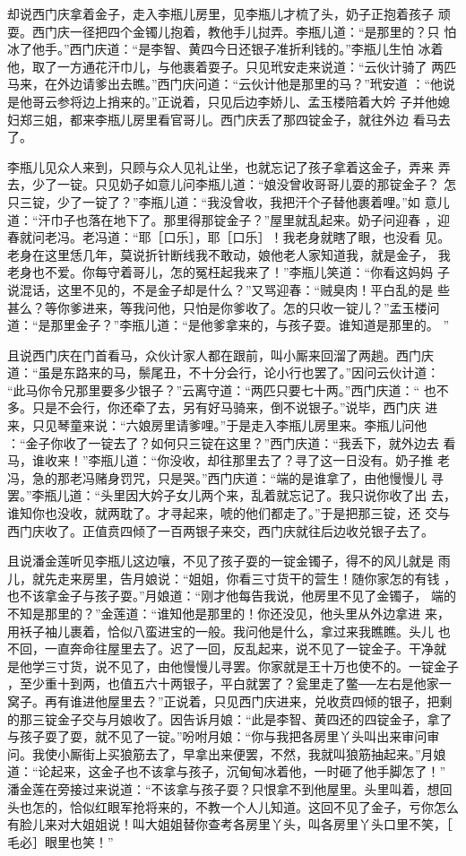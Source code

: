 却说西门庆拿着金子，走入李瓶儿房里，见李瓶儿才梳了头，奶子正抱着孩子
顽耍。西门庆一径把四个金镯儿抱着，教他手儿挝弄。李瓶儿道：“是那里的？只
怕冰了他手。”西门庆道：“是李智、黄四今日还银子准折利钱的。”李瓶儿生怕
冰着他，取了一方通花汗巾儿，与他裹着耍子。只见玳安走来说道：“云伙计骑了
两匹马来，在外边请爹出去瞧。”西门庆问道：“云伙计他是那里的马？”玳安道
：“他说是他哥云参将边上捎来的。”正说着，只见后边李娇儿、孟玉楼陪着大妗
子并他媳妇郑三姐，都来李瓶儿房里看官哥儿。西门庆丢了那四锭金子，就往外边
看马去了。

李瓶儿见众人来到，只顾与众人见礼让坐，也就忘记了孩子拿着这金子，弄来
弄去，少了一锭。只见奶子如意儿问李瓶儿道：“娘没曾收哥哥儿耍的那锭金子？
怎只三锭，少了一锭了？”李瓶儿道：“我没曾收，我把汗个子替他裹着哩。”如
意儿道：“汗巾子也落在地下了。那里得那锭金子？”屋里就乱起来。奶子问迎春
，迎春就问老冯。老冯道：“耶［口乐］，耶［口乐］！我老身就瞎了眼，也没看
见。老身在这里恁几年，莫说折针断线我不敢动，娘他老人家知道我，就是金子，
我老身也不爱。你每守着哥儿，怎的冤枉起我来了！”李瓶儿笑道：“你看这妈妈
子说混话，这里不见的，不是金子却是什么？”又骂迎春：“贼臭肉！平白乱的是
些甚么？等你爹进来，等我问他，只怕是你爹收了。怎的只收一锭儿？”孟玉楼问
道：“是那里金子？”李瓶儿道：“是他爹拿来的，与孩子耍。谁知道是那里的。
”

且说西门庆在门首看马，众伙计家人都在跟前，叫小厮来回溜了两趟。西门庆
道：“虽是东路来的马，鬃尾丑，不十分会行，论小行也罢了。”因问云伙计道：
“此马你令兄那里要多少银子？”云离守道：“两匹只要七十两。”西门庆道：“
也不多。只是不会行，你还牵了去，另有好马骑来，倒不说银子。”说毕，西门庆
进来，只见琴童来说：“六娘房里请爹哩。”于是走入李瓶儿房里来。李瓶儿问他
：“金子你收了一锭去了？如何只三锭在这里？”西门庆道：“我丢下，就外边去
看马，谁收来！”李瓶儿道：“你没收，却往那里去了？寻了这一日没有。奶子推
老冯，急的那老冯赌身罚咒，只是哭。”西门庆道：“端的是谁拿了，由他慢慢儿
寻罢。”李瓶儿道：“头里因大妗子女儿两个来，乱着就忘记了。我只说你收了出
去，谁知你也没收，就两耽了。才寻起来，唬的他们都走了。”于是把那三锭，还
交与西门庆收了。正值贲四倾了一百两银子来交，西门庆就往后边收兑银子去了。

且说潘金莲听见李瓶儿这边嚷，不见了孩子耍的一锭金镯子，得不的风儿就是
雨儿，就先走来房里，告月娘说：“姐姐，你看三寸货干的营生！随你家怎的有钱
，也不该拿金子与孩子耍。”月娘道：“刚才他每告我说，他房里不见了金镯子，
端的不知是那里的？”金莲道：“谁知他是那里的！你还没见，他头里从外边拿进
来，用袄子袖儿裹着，恰似八蛮进宝的一般。我问他是什么，拿过来我瞧瞧。头儿
也不回，一直奔命往屋里去了。迟了一回，反乱起来，说不见了一锭金子。干净就
是他学三寸货，说不见了，由他慢慢儿寻罢。你家就是王十万也使不的。一锭金子
，至少重十到两，也值五六十两银子，平白就罢了？瓮里走了鳖──左右是他家一
窝子。再有谁进他屋里去？”正说着，只见西门庆进来，兑收贲四倾的银子，把剩
的那三锭金子交与月娘收了。因告诉月娘：“此是李智、黄四还的四锭金子，拿了
与孩子耍了耍，就不见了一锭。”吩咐月娘：“你与我把各房里丫头叫出来审问审
问。我使小厮街上买狼筋去了，早拿出来便罢，不然，我就叫狼筋抽起来。”月娘
道：“论起来，这金子也不该拿与孩子，沉甸甸冰着他，一时砸了他手脚怎了！”
潘金莲在旁接过来说道：“不该拿与孩子耍？只恨拿不到他屋里。头里叫着，想回
头也怎的，恰似红眼军抢将来的，不教一个人儿知道。这回不见了金子，亏你怎么
有脸儿来对大姐姐说！叫大姐姐替你查考各房里丫头，叫各房里丫头口里不笑，［
毛必］眼里也笑！”

